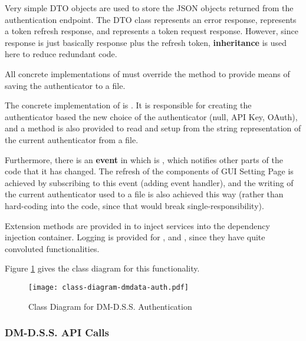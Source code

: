 Very simple DTO objects are used to store the JSON objects returned from the authentication endpoint. The  DTO class represents an error response,  represents a token refresh response, and  represents a token request response. However, since  response is just basically  response plus the refresh token, \textbf{inheritance} is used here to reduce redundant code.

All concrete implementations of  must override the  method to provide means of saving the authenticator to a file.

The concrete implementation of  is . It is responsible for creating the authenticator based the new choice of the authenticator (null, API Key, OAuth), and a method is also provided to read and setup from the string representation of the current authenticator from a file.

Furthermore, there is an \textbf{event} in  which is , which notifies other parts of the code that it has changed. The refresh of the components of GUI Setting Page is achieved by subscribing to this event (adding event handler), and the writing of the current authenticator used to a file is also achieved this way (rather than hard-coding into the code, since that would break single-responsibility).

Extension methods are provided in  to inject services into the dependency injection container. Logging is provided for ,  and , since they have quite convoluted functionalities.

Figure \ref{fig:class-diagram-dmdata-auth} gives the class diagram for this functionality.

\begin{figure}[htp]
    \centering
    \texttt{[image: class-diagram-dmdata-auth.pdf]}
    \caption{Class Diagram for DM-D.S.S. Authentication}
    \label{fig:class-diagram-dmdata-auth}
\end{figure}

\subsubsection{DM-D.S.S. API Calls}

